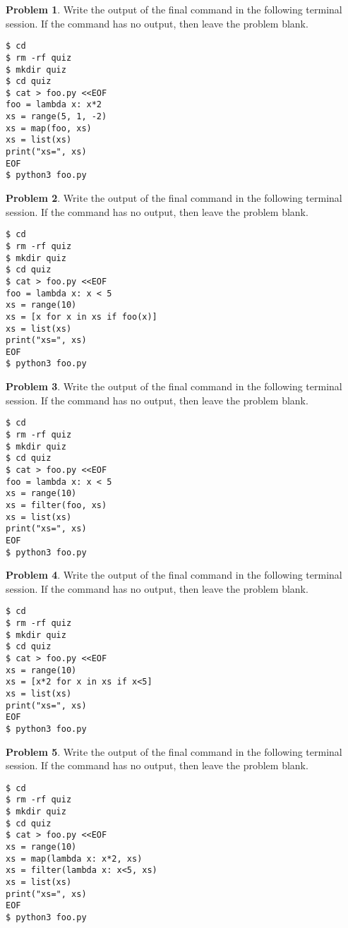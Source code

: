 \documentclass[10pt]{article}
\theoremstyle{definition}
\newtheorem{problem}{Problem}
\begin{document}
\begin{problem}
    Write the output of the final command in the following terminal session.
    If the command has no output, then leave the problem blank.
\end{problem}
\begin{lstlisting}
$ cd
$ rm -rf quiz
$ mkdir quiz
$ cd quiz
$ cat > foo.py <<EOF
foo = lambda x: x*2
xs = range(5, 1, -2)
xs = map(foo, xs)
xs = list(xs)
print("xs=", xs)
EOF
$ python3 foo.py
\end{lstlisting}
\vspace{0.4in}

\begin{problem}
    Write the output of the final command in the following terminal session.
    If the command has no output, then leave the problem blank.
\end{problem}
\begin{lstlisting}
$ cd
$ rm -rf quiz
$ mkdir quiz
$ cd quiz
$ cat > foo.py <<EOF
foo = lambda x: x < 5
xs = range(10)
xs = [x for x in xs if foo(x)]
xs = list(xs)
print("xs=", xs)
EOF
$ python3 foo.py
\end{lstlisting}
\vspace{0.4in}

\begin{problem}
    Write the output of the final command in the following terminal session.
    If the command has no output, then leave the problem blank.
\end{problem}
\begin{lstlisting}
$ cd
$ rm -rf quiz
$ mkdir quiz
$ cd quiz
$ cat > foo.py <<EOF
foo = lambda x: x < 5
xs = range(10)
xs = filter(foo, xs)
xs = list(xs)
print("xs=", xs)
EOF
$ python3 foo.py
\end{lstlisting}
\vspace{0.4in}

\begin{problem}
    Write the output of the final command in the following terminal session.
    If the command has no output, then leave the problem blank.
\end{problem}
\begin{lstlisting}
$ cd
$ rm -rf quiz
$ mkdir quiz
$ cd quiz
$ cat > foo.py <<EOF
xs = range(10)
xs = [x*2 for x in xs if x<5]
xs = list(xs)
print("xs=", xs)
EOF
$ python3 foo.py
\end{lstlisting}
\vspace{0.4in}

\begin{problem}
    Write the output of the final command in the following terminal session.
    If the command has no output, then leave the problem blank.
\end{problem}
\begin{lstlisting}
$ cd
$ rm -rf quiz
$ mkdir quiz
$ cd quiz
$ cat > foo.py <<EOF
xs = range(10)
xs = map(lambda x: x*2, xs)
xs = filter(lambda x: x<5, xs)
xs = list(xs)
print("xs=", xs)
EOF
$ python3 foo.py
\end{lstlisting}
\vspace{0.4in}
\end{document}
